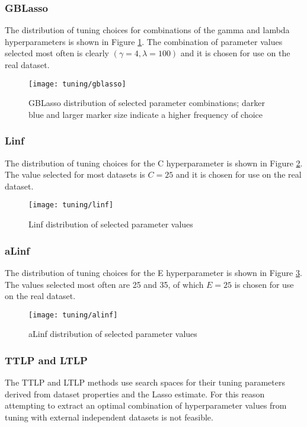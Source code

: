 \pagebreak

\subsubsection{GBLasso}
The distribution of tuning choices for combinations of the gamma and lambda hyperparameters is shown in Figure \ref{fig:tun_gblasso}. The combination of parameter values selected most often is clearly $(\gamma = 4, \lambda=100)$ and it is chosen for use on the real dataset.
\begin{figure}[H]
	\centering
	\texttt{[image: tuning/gblasso]}
	\caption{GBLasso distribution of selected parameter combinations; darker blue and larger marker size indicate a higher frequency of choice}
	\label{fig:tun_gblasso}
\end{figure}

\pagebreak

\subsubsection{Linf}
The distribution of tuning choices for the C hyperparameter is shown in Figure \ref{fig:tun_linf}. The value selected for most datasets is $C = 25$ and it is chosen for use on the real dataset.
\begin{figure}[H]
	\centering
	\texttt{[image: tuning/linf]}
	\caption{Linf distribution of selected parameter values}
	\label{fig:tun_linf}
\end{figure}

\pagebreak

\subsubsection{aLinf}
The distribution of tuning choices for the E hyperparameter is shown in Figure \ref{fig:tun_alinf}. The values selected most often are 25 and 35, of which $E = 25$ is chosen for use on the real dataset.
\begin{figure}[H]
	\centering
	\texttt{[image: tuning/alinf]}
	\caption{aLinf distribution of selected parameter values}
	\label{fig:tun_alinf}
\end{figure}

\pagebreak

\subsubsection{TTLP and LTLP}
The TTLP and LTLP methods use search spaces for their tuning parameters derived from dataset properties and the Lasso estimate. For this reason attempting to extract an optimal combination of hyperparameter values from tuning with external independent datasets is not feasible. 

